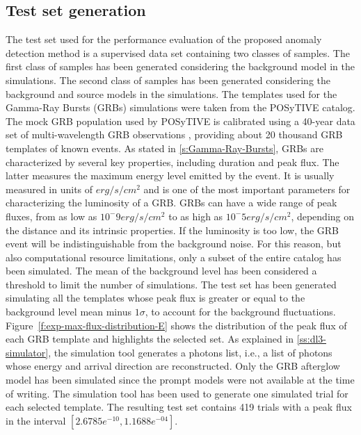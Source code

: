 \subsection{Test set generation}
\label{s:Experiment-Data}
The test set used for the performance evaluation of the proposed anomaly detection method is a supervised data set containing two classes of samples. The first class of samples has been generated considering the background model in the simulations. The second class of samples has been generated considering the background and source models in the simulations. The templates used for the Gamma-Ray Bursts (GRBs) simulations were taken from the POSyTIVE catalog. The mock GRB population used by POSyTIVE is calibrated using a 40-year data set of multi-wavelength GRB observations \cite{Bernardini_2019}, providing about 20 thousand GRB templates of known events.
As stated in \autoref{s:Gamma-Ray-Bursts}, GRBs are characterized by several key properties, including duration and peak flux. The latter measures the maximum energy level emitted by the event. It is usually measured in units of $erg/s/cm^2$ and is one of the most important parameters for characterizing the luminosity of a GRB. GRBs can have a wide range of peak fluxes, from as low as $10^-9 erg/s/cm^2$ to as high as $10^-5 erg/s/cm^2$, depending on the distance and its intrinsic properties. If the luminosity is too low, the GRB event will be indistinguishable from the background noise. For this reason, but also computational resource limitations, only a subset of the entire catalog has been simulated. 
The mean of the background level has been considered a threshold to limit the number of simulations. The test set has been generated simulating all the templates whose peak flux is greater or equal to the background level mean minus $1\sigma$, to account for the background fluctuations. Figure~\ref{f:exp-max-flux-distribution-E} shows the distribution of the peak flux of each GRB template and highlights the selected set. As explained in \autoref{ss:dl3-simulator}, the simulation tool generates a photons list, i.e., a list of photons whose energy and arrival direction are reconstructed. Only the GRB afterglow model has been simulated since the prompt models were not available at the time of writing. The simulation tool has been used to generate one simulated trial for each selected template. The resulting test set contains 419 trials with a peak flux in the interval $[2.6785e^{-10}, 1.1688e^{-04}]$.

